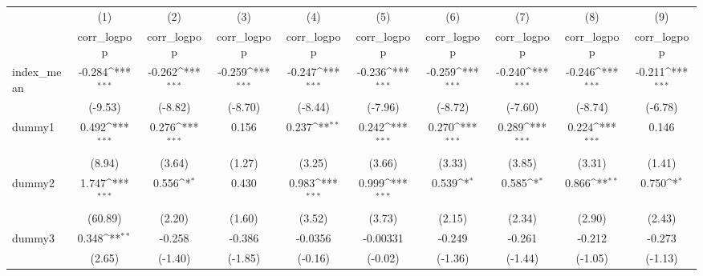 {
\def\sym#1{\ifmmode^{#1}\else\(^{#1}\)\fi}
\begin{tabular}{l*{9}{c}}
\hline\hline
            &\multicolumn{1}{c}{(1)}&\multicolumn{1}{c}{(2)}&\multicolumn{1}{c}{(3)}&\multicolumn{1}{c}{(4)}&\multicolumn{1}{c}{(5)}&\multicolumn{1}{c}{(6)}&\multicolumn{1}{c}{(7)}&\multicolumn{1}{c}{(8)}&\multicolumn{1}{c}{(9)}\\
            &\multicolumn{1}{c}{corr\_logpop}&\multicolumn{1}{c}{corr\_logpop}&\multicolumn{1}{c}{corr\_logpop}&\multicolumn{1}{c}{corr\_logpop}&\multicolumn{1}{c}{corr\_logpop}&\multicolumn{1}{c}{corr\_logpop}&\multicolumn{1}{c}{corr\_logpop}&\multicolumn{1}{c}{corr\_logpop}&\multicolumn{1}{c}{corr\_logpop}\\
\hline
index\_mean  &      -0.284\sym{***}&      -0.262\sym{***}&      -0.259\sym{***}&      -0.247\sym{***}&      -0.236\sym{***}&      -0.259\sym{***}&      -0.240\sym{***}&      -0.246\sym{***}&      -0.211\sym{***}\\
            &     (-9.53)         &     (-8.82)         &     (-8.70)         &     (-8.44)         &     (-7.96)         &     (-8.72)         &     (-7.60)         &     (-8.74)         &     (-6.78)         \\
[1em]
dummy1      &       0.492\sym{***}&       0.276\sym{***}&       0.156         &       0.237\sym{**} &       0.242\sym{***}&       0.270\sym{***}&       0.289\sym{***}&       0.224\sym{***}&       0.146         \\
            &      (8.94)         &      (3.64)         &      (1.27)         &      (3.25)         &      (3.66)         &      (3.33)         &      (3.85)         &      (3.31)         &      (1.41)         \\
[1em]
dummy2      &       1.747\sym{***}&       0.556\sym{*}  &       0.430         &       0.983\sym{***}&       0.999\sym{***}&       0.539\sym{*}  &       0.585\sym{*}  &       0.866\sym{**} &       0.750\sym{*}  \\
            &     (60.89)         &      (2.20)         &      (1.60)         &      (3.52)         &      (3.73)         &      (2.15)         &      (2.34)         &      (2.90)         &      (2.43)         \\
[1em]
dummy3      &       0.348\sym{**} &      -0.258         &      -0.386         &     -0.0356         &    -0.00331         &      -0.249         &      -0.261         &      -0.212         &      -0.273         \\
            &      (2.65)         &     (-1.40)         &     (-1.85)         &     (-0.16)         &     (-0.02)         &     (-1.36)         &     (-1.44)         &     (-1.05)         &     (-1.13)         \\

\end{tabular}}
